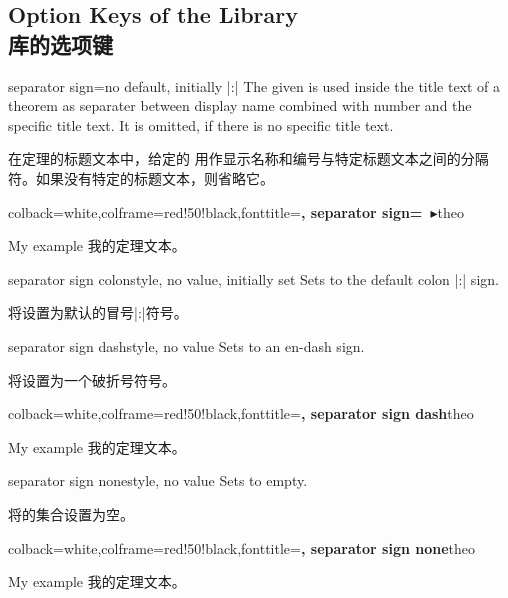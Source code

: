 \subsection{Option Keys of the Library\\库的选项键}


\begin{docTcbKey}{separator sign}{=}{no default, initially |:|}
The given  is used inside the title text of a theorem
as separater between display name combined with number and
the specific title text. It is omitted, if there is no specific title text.

在定理的标题文本中，给定的  用作显示名称和编号与特定标题文本之间的分隔符。如果没有特定的标题文本，则省略它。
\begin{dispExample}
%
  {colback=white,colframe=red!50!black,fonttitle=\bfseries,
   separator sign={\ $\blacktriangleright$}}{theo}
\begin{sometheorem}{My example}{}
我的定理文本。
\end{sometheorem}
\end{dispExample}
\end{docTcbKey}

\begin{docTcbKey}{separator sign colon}{}{style, no value, initially set}
Sets  to the default colon |:| sign.

将设置为默认的冒号|:|符号。
\end{docTcbKey}

\begin{docTcbKey}{separator sign dash}{}{style, no value}
Sets  to an en-dash sign.

将设置为一个破折号符号。
\begin{dispExample}
%
  {colback=white,colframe=red!50!black,fonttitle=\bfseries,
   separator sign dash}{theo}
\begin{sometheorem}{My example}{}
我的定理文本。
\end{sometheorem}
\end{dispExample}
\end{docTcbKey}

\begin{docTcbKey}{separator sign none}{}{style, no value}
Sets  to empty.

将的集合设置为空。
\begin{dispExample}
%
  {colback=white,colframe=red!50!black,fonttitle=\bfseries,
   separator sign none}{theo}
\begin{sometheorem}{My example}{}
我的定理文本。
\end{sometheorem}
\end{dispExample}
\end{docTcbKey}

